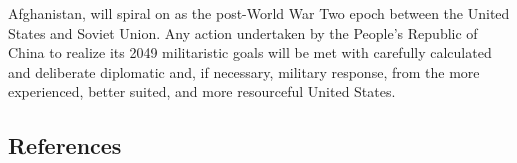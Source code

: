 \documentclass[12pt]{article}
\begin{document}
Afghanistan, will spiral on as the post-World War Two epoch between the United States and Soviet Union. Any action undertaken by the People's Republic of China to realize its 2049 militaristic goals will be met with carefully calculated and deliberate diplomatic and, if necessary, military response, from the more experienced, better suited, and more resourceful United States.

\clearpage



\begin{center}
  \section{References}
\end{center}
\end{document}
